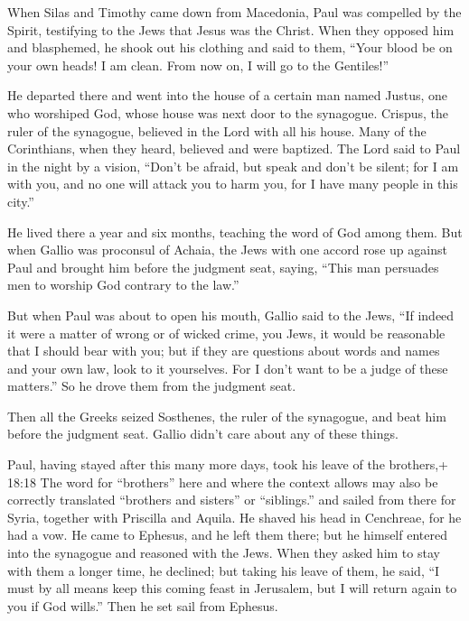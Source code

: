  When Silas and Timothy came down from Macedonia, Paul was
compelled by the Spirit, testifying to the Jews that Jesus was the
Christ.  When they opposed him and blasphemed, he shook out
his clothing and said to them, ``Your blood be on your own heads! I am
clean. From now on, I will go to the Gentiles!''

 He departed there and went into the house of a certain man
named Justus, one who worshiped God, whose house was next door to the
synagogue.  Crispus, the ruler of the synagogue, believed in
the Lord with all his house. Many of the Corinthians, when they heard,
believed and were baptized.  The Lord said to Paul in the
night by a vision, ``Don't be afraid, but speak and don't be silent;
 for I am with you, and no one will attack you to harm you,
for I have many people in this city.''

 He lived there a year and six months, teaching the word of
God among them.  But when Gallio was proconsul of Achaia,
the Jews with one accord rose up against Paul and brought him before the
judgment seat,  saying, ``This man persuades men to worship
God contrary to the law.''

 But when Paul was about to open his mouth, Gallio said to
the Jews, ``If indeed it were a matter of wrong or of wicked crime, you
Jews, it would be reasonable that I should bear with you; 
but if they are questions about words and names and your own law, look
to it yourselves. For I don't want to be a judge of these matters.''
 So he drove them from the judgment seat.

 Then all the Greeks seized Sosthenes, the ruler of the
synagogue, and beat him before the judgment seat. Gallio didn't care
about any of these things.

 Paul, having stayed after this many more days, took his
leave of the brothers,+ 18:18 The word for ``brothers'' here and where
the context allows may also be correctly translated ``brothers and
sisters'' or ``siblings.'' and sailed from there for Syria, together
with Priscilla and Aquila. He shaved his head in Cenchreae, for he had a
vow.  He came to Ephesus, and he left them there; but he
himself entered into the synagogue and reasoned with the Jews.
 When they asked him to stay with them a longer time, he
declined;  but taking his leave of them, he said, ``I must
by all means keep this coming feast in Jerusalem, but I will return
again to you if God wills.'' Then he set sail from Ephesus.

